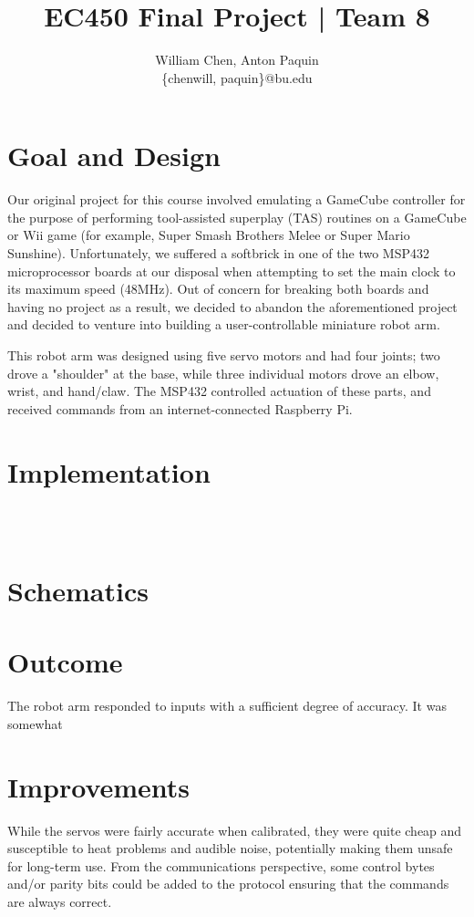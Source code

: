 \documentclass[10pt]{article}
\title{\textbf{EC450 Final Project | Team 8}}
\author{William Chen,
		Anton Paquin\\ \{chenwill, paquin\}@bu.edu}
\date{}
\begin{document}
\maketitle

\section{Goal and Design}

Our original project for this course involved emulating a GameCube controller for the purpose of performing tool-assisted superplay (TAS) routines on a GameCube or Wii game (for example, Super Smash Brothers Melee or Super Mario Sunshine). Unfortunately, we suffered a softbrick in one of the two MSP432 microprocessor boards at our disposal when attempting to set the main clock to its maximum speed (48MHz). Out of concern for breaking both boards and having no project as a result, we decided to abandon the aforementioned project and decided to venture into building a user-controllable miniature robot arm. \newline

This robot arm was designed using five servo motors and had four joints; two drove a "shoulder" at the base, while three individual motors drove an elbow, wrist, and hand/claw. The MSP432 controlled actuation of these parts, and received commands from an internet-connected Raspberry Pi.

\section{Implementation}




\begin{lstlisting}



\end{lstlisting}


\section{Schematics}

\section{Outcome}

The robot arm responded to inputs with a sufficient degree of accuracy. It was somewhat  


\section{Improvements}
While the servos were fairly accurate when calibrated, they were quite cheap and susceptible to heat problems and audible noise, potentially making them unsafe for long-term use.
From the communications perspective, some control bytes and/or parity bits could be added to the protocol ensuring that the commands are always correct.
\end{document}

